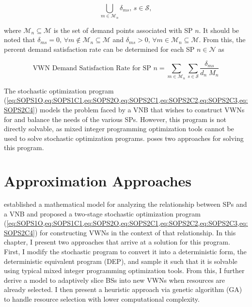 \documentclass[12pt,dvipsnames]{report}
\begin{document}
\begin{equation} \label{eq:delta_union_VWN}
\bigcup_{m \in \mathcal{M}_n} \delta_{ms},\, s \in \mathcal{S},
\end{equation}

\noindent where $\mathcal{M}_n \subseteq \mathcal{M}$ is the set of demand points associated with SP $n$.  It should be noted that $\delta_{ms} = 0,\, \forall m \not\in \mathcal{M}_n \subseteq \mathcal{M}$ and $\delta_{ms} > 0,\, \forall m \in \mathcal{M}_n \subseteq \mathcal{M}$.  From this, the percent demand satisfaction rate can be determined for each SP $n \in \mathcal{N}$ as

\begin{equation} \label{eq:VWN_demand_sat}
\text{VWN Demand Satisfaction Rate for SP $n$} = \sum_{m \in \mathcal{M}_n} \sum_{s \in \mathcal{S}} \frac{\delta_{ms}}{d_n \; M_n}
\end{equation}

The stochastic optimization program (\cref{eq:SOPS1O,eq:SOPS1C1,eq:SOPS2O,eq:SOPS2C1,eq:SOPS2C2,eq:SOPS2C3,eq:SOPS2C4}) models the problem faced by a VNB that wishes to construct VWNs for and balance the needs of the various SPs.  However, this program is not directly solvable, as mixed integer programming optimization tools cannot be used to solve stochastic optimization programs.   poses two approaches for solving this program.

\iftrue
\pagebreak
\chapter{Approximation Approaches} \label{ch:approaches}

 established a mathematical model for analyzing the relationship between SPs and a VNB and proposed a two-stage stochastic optimization program (\cref{eq:SOPS1O,eq:SOPS1C1,eq:SOPS2O,eq:SOPS2C1,eq:SOPS2C2,eq:SOPS2C3,eq:SOPS2C4}) for constructing VWNs in the context of that relationship.  In this chapter, I present two approaches that arrive at a solution for this program.  First, I modify the stochastic program to convert it into a deterministic form, the deterministic equivalent program (DEP), and sample it such that it is solvable using typical mixed integer programming optimization tools.  From this, I further derive a model to adaptively slice BSs into new VWNs when resources are already selected.  I then present a heuristic approach via genetic algorithm (GA) to handle resource selection with lower computational complexity.
\end{document}
